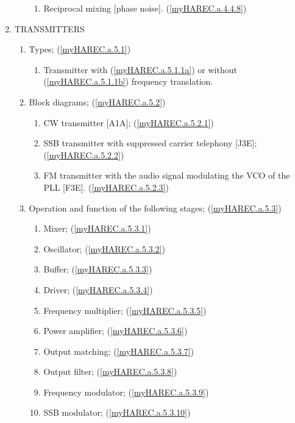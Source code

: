 \begin{enumerate}
\begin{enumerate}[noitemsep]
\begin{enumerate}[noitemsep]
\item Reciprocal mixing [phase noise]. (\ref{myHAREC.a.4.4.8})\label{HAREC.a.4.4.8}
\end{enumerate}
\end{enumerate}
\item TRANSMITTERS
\begin{enumerate}[noitemsep]
\item Types; (\ref{myHAREC.a.5.1})\label{HAREC.a.5.1}
\begin{enumerate}[noitemsep]
\item Transmitter with (\ref{myHAREC.a.5.1.1a})\label{HAREC.a.5.1.1a} or without (\ref{myHAREC.a.5.1.1b})\label{HAREC.a.5.1.1b} frequency translation.
\end{enumerate}
\item Block diagrams; (\ref{myHAREC.a.5.2})\label{HAREC.a.5.2}
\begin{enumerate}[noitemsep]
\item CW transmitter [A1A]; (\ref{myHAREC.a.5.2.1})\label{HAREC.a.5.2.1}
\item SSB transmitter with suppressed carrier telephony [J3E]; (\ref{myHAREC.a.5.2.2})\label{HAREC.a.5.2.2}
\item FM transmitter with the audio signal modulating the VCO of the PLL [F3E]. (\ref{myHAREC.a.5.2.3})\label{HAREC.a.5.2.3}
\end{enumerate}
\item Operation and function of the following stages; (\ref{myHAREC.a.5.3})\label{HAREC.a.5.3}
\begin{enumerate}[noitemsep]
\item Mixer; (\ref{myHAREC.a.5.3.1})\label{HAREC.a.5.3.1}
\item Oscillator; (\ref{myHAREC.a.5.3.2})\label{HAREC.a.5.3.2}
\item Buffer; (\ref{myHAREC.a.5.3.3})\label{HAREC.a.5.3.3}
\item Driver; (\ref{myHAREC.a.5.3.4})\label{HAREC.a.5.3.4}
\item Frequency multiplier; (\ref{myHAREC.a.5.3.5})\label{HAREC.a.5.3.5}
\item Power amplifier; (\ref{myHAREC.a.5.3.6})\label{HAREC.a.5.3.6}
\item Output matching; (\ref{myHAREC.a.5.3.7})\label{HAREC.a.5.3.7}
\item Output filter; (\ref{myHAREC.a.5.3.8})\label{HAREC.a.5.3.8}
\item Frequency modulator; (\ref{myHAREC.a.5.3.9})\label{HAREC.a.5.3.9}
\item SSB modulator; (\ref{myHAREC.a.5.3.10})\label{HAREC.a.5.3.10}

\end{enumerate}
\end{enumerate}
\end{enumerate}
